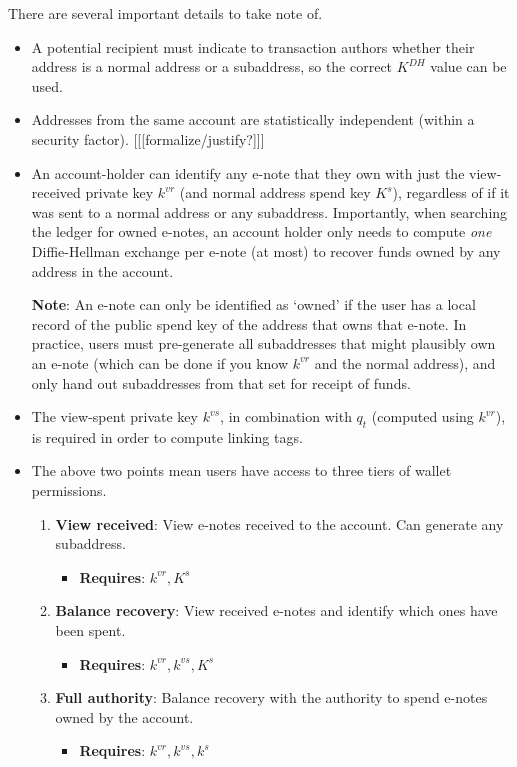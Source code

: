 There are several important details to take note of.

\begin{itemize}
    \item A potential recipient must indicate to transaction authors whether their address is a normal address or a subaddress, so the correct $K^{DH}$ value can be used.

    \item Addresses from the same account are statistically independent (within a security factor). [[[formalize/justify?]]]

    \item An account-holder can identify any e-note that they own with just the view-received private key $k^{vr}$ (and normal address spend key $K^s$), regardless of if it was sent to a normal address or any subaddress. Importantly, when searching the ledger for owned e-notes, an account holder only needs to compute {\em one} Diffie-Hellman exchange per e-note (at most) to recover funds owned by any address in the account.

    \textbf{Note}: An e-note can only be identified as `owned' if the user has a local record of the public spend key of the address that owns that e-note. In practice, users must pre-generate all subaddresses that might plausibly own an e-note (which can be done if you know $k^{vr}$ and the normal address), and only hand out subaddresses from that set for receipt of funds.

    \item The view-spent private key $k^{vs}$, in combination with $q_t$ (computed using $k^{vr}$), is required in order to compute linking tags.

    \item The above two points mean users have access to three tiers of wallet permissions.

    \begin{enumerate}
        \item \textbf{View received}: View e-notes received to the account. Can generate any subaddress.
        \begin{itemize}
            \item \textbf{Requires}: $k^{vr}, K^s$
        \end{itemize}

        \item \textbf{Balance recovery}: View received e-notes and identify which ones have been spent.
        \begin{itemize}
            \item \textbf{Requires}: $k^{vr}, k^{vs}, K^s$
        \end{itemize}

        \item \textbf{Full authority}: Balance recovery with the authority to spend e-notes owned by the account.
        \begin{itemize}
            \item \textbf{Requires}: $k^{vr}, k^{vs}, k^s$
        \end{itemize}
    \end{enumerate}
\end{itemize}

